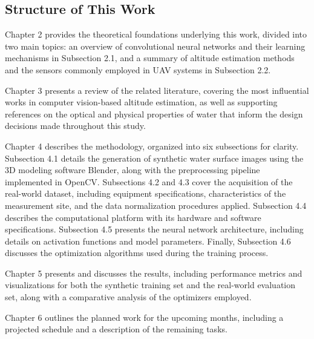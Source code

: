 \subsection{Structure of This Work}

Chapter 2 provides the theoretical foundations underlying this work, divided into two main topics: an overview of convolutional neural networks and their learning mechanisms in Subsection 2.1, and a summary of altitude estimation methods and the sensors commonly employed in UAV systems in Subsection 2.2.

Chapter 3 presents a review of the related literature, covering the most influential works in computer vision-based altitude estimation, as well as supporting references on the optical and physical properties of water that inform the design decisions made throughout this study.

Chapter 4 describes the methodology, organized into six subsections for clarity. Subsection 4.1 details the generation of synthetic water surface images using the 3D modeling software Blender, along with the preprocessing pipeline implemented in OpenCV. Subsections 4.2 and 4.3 cover the acquisition of the real-world dataset, including equipment specifications, characteristics of the measurement site, and the data normalization procedures applied. Subsection 4.4 describes the computational platform with its hardware and software specifications. Subsection 4.5 presents the neural network architecture, including details on activation functions and model parameters. Finally, Subsection 4.6 discusses the optimization algorithms used during the training process.

Chapter 5 presents and discusses the results, including performance metrics and visualizations for both the synthetic training set and the real-world evaluation set, along with a comparative analysis of the optimizers employed.

Chapter 6 outlines the planned work for the upcoming months, including a projected schedule and a description of the remaining tasks.